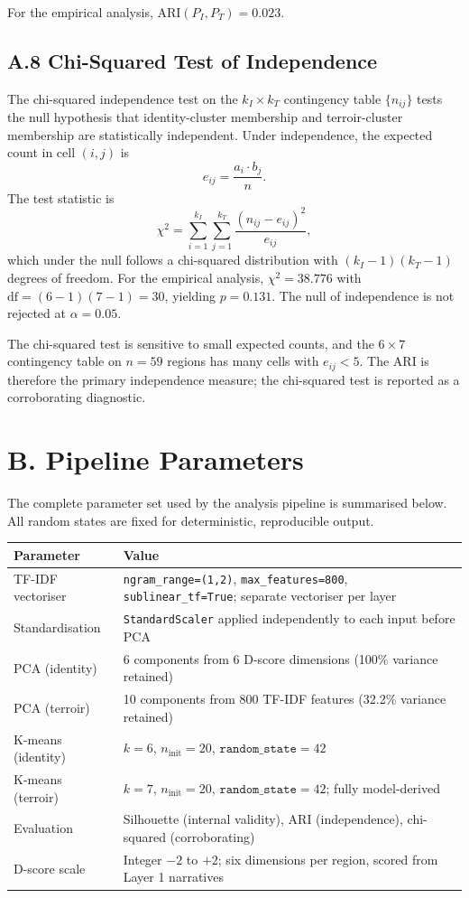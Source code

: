\documentclass[11pt]{article}
\begin{document}
For the empirical analysis, $\mathrm{ARI}(P_I, P_T) = 0.023$.

\subsection*{A.8 Chi-Squared Test of Independence}
The chi-squared independence test on the $k_I \times k_T$ contingency table $\{n_{ij}\}$ tests the null hypothesis that identity-cluster membership and terroir-cluster membership are statistically independent. Under independence, the expected count in cell $(i, j)$ is
\[
e_{ij} = \frac{a_i \cdot b_j}{n}.
\]
The test statistic is
\[
\chi^2 = \sum_{i=1}^{k_I} \sum_{j=1}^{k_T} \frac{(n_{ij} - e_{ij})^2}{e_{ij}},
\]
which under the null follows a chi-squared distribution with $(k_I - 1)(k_T - 1)$ degrees of freedom. For the empirical analysis, $\chi^2 = 38.776$ with $\mathrm{df} = (6-1)(7-1) = 30$, yielding $p = 0.131$. The null of independence is not rejected at $\alpha = 0.05$.

The chi-squared test is sensitive to small expected counts, and the $6 \times 7$ contingency table on $n = 59$ regions has many cells with $e_{ij} < 5$. The ARI is therefore the primary independence measure; the chi-squared test is reported as a corroborating diagnostic.

\section*{B. Pipeline Parameters}

The complete parameter set used by the analysis pipeline is summarised below. All random states are fixed for deterministic, reproducible output.

\begin{center}
\begin{tabular}{@{}lp{9.5cm}@{}}
\toprule
Parameter & Value \\
\midrule
TF-IDF vectoriser   & \texttt{ngram\_range=(1,2)}, \texttt{max\_features=800}, \texttt{sublinear\_tf=True}; separate vectoriser per layer \\
Standardisation     & \texttt{StandardScaler} applied independently to each input before PCA \\
PCA (identity)      & 6 components from 6 D-score dimensions (100\% variance retained) \\
PCA (terroir)       & 10 components from 800 TF-IDF features (32.2\% variance retained) \\
K-means (identity)  & $k = 6$, $n_\text{init} = 20$, $\texttt{random\_state} = 42$ \\
K-means (terroir)   & $k = 7$, $n_\text{init} = 20$, $\texttt{random\_state} = 42$; fully model-derived \\
Evaluation          & Silhouette (internal validity), ARI (independence), chi-squared (corroborating) \\
D-score scale       & Integer $-2$ to $+2$; six dimensions per region, scored from Layer 1 narratives \\
\bottomrule
\end{tabular}
\end{center}
\end{document}
